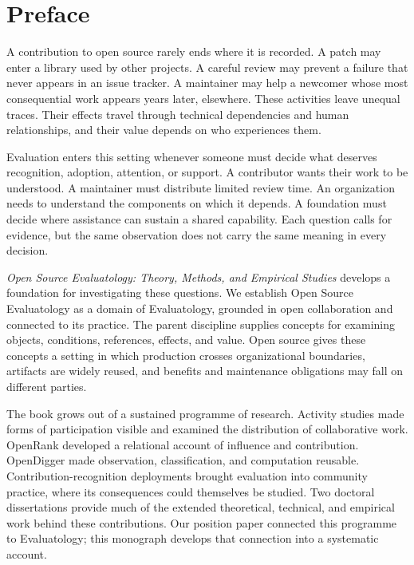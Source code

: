 \chapter*{Preface}
\label{review:preface}
A contribution to open source rarely ends where it is recorded. A patch may enter a library used by other projects. A careful review may prevent a failure that never appears in an issue tracker. A maintainer may help a newcomer whose most consequential work appears years later, elsewhere. These activities leave unequal traces. Their effects travel through technical dependencies and human relationships, and their value depends on who experiences them.

Evaluation enters this setting whenever someone must decide what deserves recognition, adoption, attention, or support. A contributor wants their work to be understood. A maintainer must distribute limited review time. An organization needs to understand the components on which it depends. A foundation must decide where assistance can sustain a shared capability. Each question calls for evidence, but the same observation does not carry the same meaning in every decision.

\emph{Open Source Evaluatology: Theory, Methods, and Empirical Studies} develops a foundation for investigating these questions. We establish Open Source Evaluatology as a domain of Evaluatology, grounded in open collaboration and connected to its practice. The parent discipline supplies concepts for examining objects, conditions, references, effects, and value. Open source gives these concepts a setting in which production crosses organizational boundaries, artifacts are widely reused, and benefits and maintenance obligations may fall on different parties.

The book grows out of a sustained programme of research. Activity studies made forms of participation visible and examined the distribution of collaborative work. OpenRank developed a relational account of influence and contribution. OpenDigger made observation, classification, and computation reusable. Contribution-recognition deployments brought evaluation into community practice, where its consequences could themselves be studied. Two doctoral dissertations provide much of the extended theoretical, technical, and empirical work behind these contributions. Our position paper connected this programme to Evaluatology; this monograph develops that connection into a systematic account.

